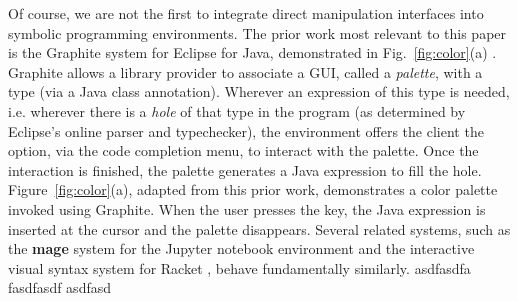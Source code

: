 
Of course, we are not the first to integrate direct manipulation interfaces
into symbolic programming environments.
The prior work most relevant to this paper is the {Graphite} system for Eclipse for Java,
demonstrated in Fig.~\ref{fig:color}(a) \cite{Graphite}.
Graphite allows a library provider to associate a GUI, called a \emph{palette}, with a type 
(via a Java class annotation).
Wherever an expression of this type is needed,
i.e. wherever there is a \emph{hole} of that type in the program
(as determined by Eclipse's online parser and typechecker),
the environment offers the client the option, via the code completion menu,
to interact with the palette.
Once the interaction is finished, the palette generates a
Java expression to fill the hole.
Figure~\ref{fig:color}(a), adapted from this prior work, demonstrates a color palette invoked using Graphite.
When the user presses the  key, the Java expression  is inserted at the cursor and the palette disappears.
Several related systems, such as the  
\textbf{mage} system for the Jupyter notebook environment \cite{DBLP:conf/uist/KeryRHMWP20}
and the interactive visual syntax system for Racket \cite{interactive-visual-syntax}, behave fundamentally similarly.
asdfasdfa
fasdfasdf
asdfasd

